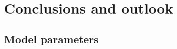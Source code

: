 \documentclass[a4paper,11pt,twoside,onecolumn]{book}
\begin{document}
\chapter{Conclusions and outlook}
\label{conclusion}
%


\appendix
\begin{landscape}
\chapter{Model parameters}
\label{sec:coefficients}
%
\end{landscape}




\backmatter



\end{document}
